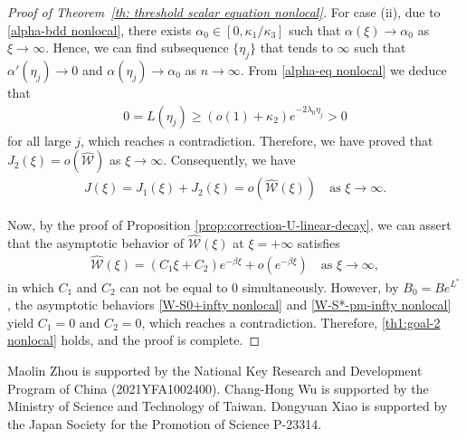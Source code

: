 \documentclass[11pt,a4paper]{article}
\numberwithin{equation}{section}
\numberwithin{figure}{section}
\newcommand\beaa{\begin{eqnarray*}}
\newcommand\eeaa{\end{eqnarray*}}
\begin{document}
\begin{proof}[Proof of Theorem~\ref{th: threshold scalar equation nonlocal}]
For case (ii),
due to \eqref{alpha-bdd nonlocal}, there exists $\alpha_0\in[0, \kappa_1/\kappa_3]$
such that $\alpha(\xi)\to \alpha_0$ as $\xi\to\infty$. Hence, we can find subsequence $\{\eta_j\}$ that tends to $\infty$ such that $\alpha'(\eta_j)\to0$ and
$\alpha(\eta_j)\to \alpha_0$ as $n\to\infty$.
From \eqref{alpha-eq nonlocal} we deduce that
\beaa
0=L(\eta_j)\geq (o(1)+ \kappa_2)e^{-2\lambda_0\eta_j}>0
\eeaa
for all large $j$, which reaches a contradiction. 
Therefore, we have proved that
$J_2(\xi)=o(\widehat{\mathcal{W}})$ as $\xi\to\infty$.
Consequently, we have
\beaa%
J(\xi)=J_1(\xi)+J_2(\xi)=o(\widehat{\mathcal{W}}(\xi))\quad \mbox{as $\xi\to\infty$.}
\eeaa


Now, by the proof of Proposition \ref{prop:correction-U-linear-decay}, we can assert that the asymptotic behavior of $\widehat{\mathcal{W}}(\xi)$ at $\xi=+\infty$ satisfies
\beaa
\widehat{\mathcal{W}}(\xi)=(C_1\xi+C_2)e^{-\beta \xi}+o(e^{-\beta\xi})\quad \mbox{as $\xi\to\infty$},
\eeaa
in which $C_1$ and $C_2$ can not be equal to $0$ simultaneously.
However, by $B_0=Be^{L^*}$, the asymptotic behaviors \eqref{W-S0+infty nonlocal} and \eqref{W-S*-pm-infty nonlocal} yield  $C_1=0$ and $C_2=0$, which reaches a contradiction.
Therefore, \eqref{th1:goal-2 nonlocal} holds, and the proof is complete.
\end{proof}




\bigskip

Maolin Zhou is supported by the National Key Research and Development Program of China (2021YFA1002400).
Chang-Hong Wu is supported by the Ministry of Science and Technology of Taiwan.
Dongyuan Xiao is supported by the Japan Society for the Promotion of Science P-23314.
\end{document}
